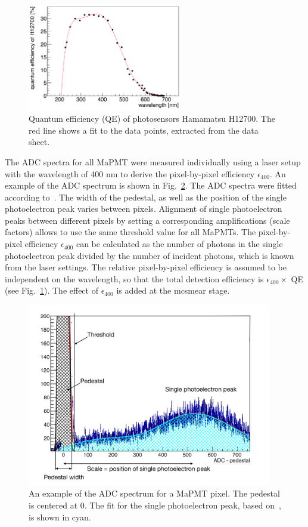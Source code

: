 \begin{figure}[!h]
\centering
\includegraphics[width=0.6\textwidth]{pics/qe.png}
\caption{\label{pic:qe}
Quantum efficiency (QE) of photosensors Hamamatsu H12700. The red line shows a fit to the data points, extracted from the data sheet.
}
\end{figure}

The ADC spectra for all MaPMT were measured individually using a laser setup with the wavelength of 400 nm to derive the pixel-by-pixel efficiency $\epsilon_{400}$. An example of the ADC spectrum is shown in Fig.~\ref{pic:adc}. The ADC spectra were fitted according to~\cite{deg}. The width of the pedestal, as well as the position of the single photoelectron peak varies between pixels. Alignment of single photoelectron peaks between different pixels by setting a corresponding amplifications (scale factors) allows to use the same threshold value for all MaPMTs. The pixel-by-pixel efficiency $\epsilon_{400}$ can be calculated as the number of photons in the single photoelectron peak divided by the number of incident photons, which is known from the laser settings. The relative pixel-by-pixel efficiency is assumed to be independent on the wavelength, so that  the total detection efficiency is $\epsilon_{400} \times$ QE (see Fig.~\ref{pic:qe}). The effect of $\epsilon_{400}$ is added at the mcsmear stage.

\begin{figure}[!h]
\centering
\includegraphics[width=0.95\textwidth]{pics/adc.pdf}
\caption{\label{pic:adc}
An example of the ADC spectrum for a MaPMT pixel. The pedestal is centered at 0. The fit for the single photoelectron peak, based on~\cite{deg}, is shown in cyan.
}
\end{figure}



